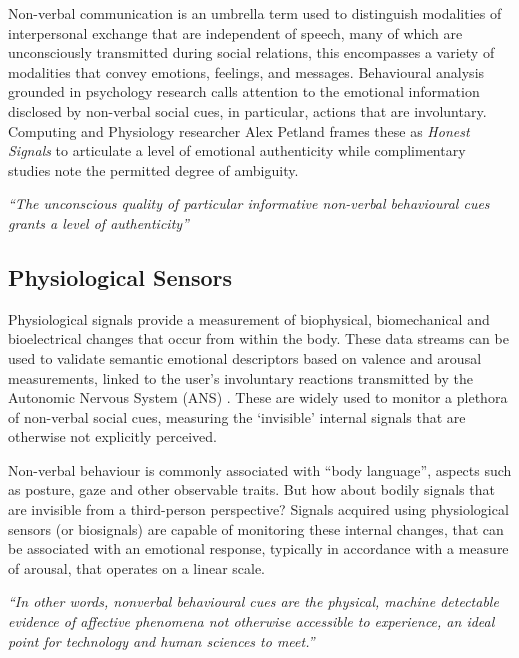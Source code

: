 Non-verbal communication is an umbrella term used to distinguish modalities of interpersonal exchange that are independent of speech, many of which are unconsciously transmitted during social relations, this encompasses a variety of modalities that convey emotions, feelings, and messages. Behavioural analysis grounded in psychology research calls attention to the emotional information disclosed by non-verbal social cues, in particular, actions that are involuntary. Computing and Physiology researcher Alex Petland frames these as \textit{Honest Signals} to articulate a level of emotional authenticity while complimentary studies note the permitted degree of ambiguity.

\textit{“The unconscious quality of particular informative non-verbal behavioural cues grants a level of authenticity”} \citeauthor{pentland_honest_2010} \cite{pentland_honest_2010}

\subsection{Physiological Sensors}

Physiological signals provide a measurement of biophysical, biomechanical and bioelectrical changes that occur from within the body. These data streams can be used to validate semantic emotional descriptors based on valence and arousal measurements, linked to the user’s involuntary reactions transmitted by the Autonomic Nervous System (ANS) \cite{levenson_autonomic_2014,shu_review_2018}. These are widely used to monitor a plethora of non-verbal social cues, measuring the ‘invisible’ internal signals that are otherwise not explicitly perceived.

Non-verbal behaviour is commonly associated with “body language”, aspects such as posture, gaze and other observable traits. But how about bodily signals that are invisible from a third-person perspective? Signals acquired using physiological sensors (or biosignals) are capable of monitoring these internal changes, that can be associated with an emotional response, typically in accordance with a measure of arousal, that operates on a linear scale.

\textit{“In other words, nonverbal behavioural cues are the physical, machine detectable evidence of affective phenomena not otherwise accessible to experience, an ideal point for technology and human sciences to meet.”} \citeauthor{vinciarelli_towards_2011} \cite{vinciarelli_towards_2011}


